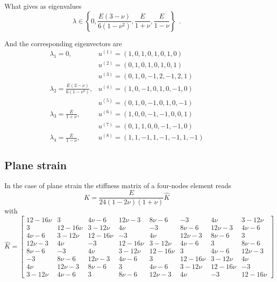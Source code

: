 What gives as eigenvalues
\[\lambda \in \left\{0,
	\frac{E(3 - \nu)}{6(1 - \nu^2)},
	\frac{E}{1 + \nu},
	\frac{E}{1 - \nu} \right\} \enspace .
\]

And the corresponding eigenvectors are
\begin{equation}
\begin{array}{ll}
\lambda_1 = 0, 
	&u^{(1)} = (1, 0, 1, 0, 1, 0, 1, 0)\\
	&u^{(2)} = (0, 1, 0, 1, 0, 1, 0, 1)\\
	&u^{(3)} = (0, 1, 0, -1, 2, -1, 2, 1)\\
\lambda_2 = \frac{E(3 - \nu)}{6(1 - \nu^2)}, 
	&u^{(4)} = (1, 0, -1, 0, 1, 0, -1, 0)\\
	&u^{(5)} = (0, 1, 0, -1, 0, 1, 0, -1)\\
\lambda_3 = \frac{E}{1 + \nu}, 
	&u^{(6)} = (1, 0, 0, -1, -1, 0, 0, 1)\\
	&u^{(7)} = (0, 1, 1, 0, 0, -1, -1, 0)\\
\lambda_4 = \frac{E}{1 - \nu}, 
	&u^{(8)} = (1, 1, -1, 1, -1, -1, 1, -1)
\end{array}
\end{equation}

\subsection{Plane strain}
In the case of plane strain the stiffness matrix of a four-nodes element reads
\begin{equation}
  K = \frac{E}{24(1 - 2\nu)(1 + \nu)} \hat{K}
\end{equation}
with
\begin{equation}
  \hat{K} = 
  \begin{bmatrix}
    12 - 16\nu & 3 & 4 \nu - 6 & 12 \nu - 3 & 8 \nu - 6 & -3 & 4 \nu & 3 - 12\nu\\
    3 & 12 - 16\nu & 3 - 12\nu & 4 \nu & -3 & 8 \nu - 6 & 12 \nu - 3 & 4 \nu - 6\\4 \nu - 6 & 3 - 12\nu & 12 - 16\nu & -3 & 4 \nu & 12 \nu - 3 & 8 \nu - 6 & 3\\
    12 \nu - 3 & 4 \nu & -3 & 12 - 16\nu & 3 - 12\nu & 4 \nu - 6 & 3 & 8 \nu - 6\\
    8 \nu - 6 & -3 & 4 \nu & 3 - 12\nu & 12 - 16\nu & 3 & 4 \nu - 6 & 12 \nu - 3\\
    -3 & 8 \nu - 6 & 12 \nu - 3 & 4 \nu - 6 & 3 & 12 - 16\nu & 3 - 12\nu & 4 \nu\\4 \nu & 12 \nu - 3 & 8 \nu - 6 & 3 & 4 \nu - 6 & 3 - 12\nu & 12 - 16\nu & -3\\
    3 - 12\nu & 4 \nu - 6 & 3 & 8 \nu - 6 & 12 \nu - 3 & 4 \nu & -3 & 12 - 16\nu
  \end{bmatrix}
\end{equation}

